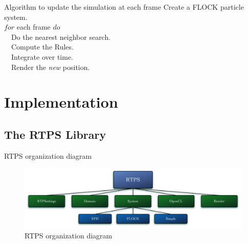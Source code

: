 \documentclass[red]{beamer}
\begin{document}
\begin{frame}{Algorithm to update the simulation at each frame}
		\alert<1>{Create a FLOCK particle system.}	\\
		\alert<2>{$for$ each frame $do$}			\\
		\alert<3>{~~Do the nearest neighbor search.}	\\
		\alert<4>{~~Compute the Rules.}				\\
		\alert<5>{~~Integrate over time.}				\\
		\alert<6>{~~Render the \textit{new} position.}	\\	
\end{frame}


\section{Implementation}

\subsection{The RTPS Library}

\begin{frame}{RTPS organization diagram}
	\begin{figure}[htbp]
	\begin{center}
	\includegraphics[scale=0.25]{../figures/RTPSdiagramMyrna.pdf}
	\caption{RTPS organization diagram}
	\end{center}
	\end{figure}
\end{frame}
\end{document}
